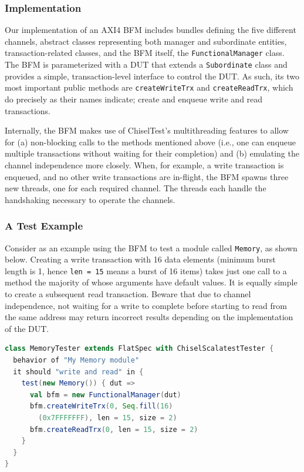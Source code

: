 \documentclass[conference]{IEEEtran}
\begin{document}
\subsubsection{Implementation}
Our implementation of an AXI4 BFM includes bundles defining the five different channels, abstract classes representing both manager and subordinate entities, transaction-related classes, and the BFM itself, the \texttt{FunctionalManager} class. The BFM is parameterized with a DUT that extends a \texttt{Subordinate} class and provides a simple, transaction-level interface to control the DUT. As such, its two most important public methods are \texttt{createWriteTrx} and \texttt{createReadTrx}, which do precisely as their names indicate; create and enqueue write and read transactions.

Internally, the BFM makes use of ChiselTest's multithreading features to allow for (a) non-blocking calls to the methods mentioned above (i.e., one can enqueue multiple transactions without waiting for their completion) and (b) emulating the channel independence more closely. When, for example, a write transaction is enqueued, and no other write transactions are in-flight, the BFM spawns three new threads, one for each required channel. The threads each handle the handshaking necessary to operate the channels.

\subsubsection{A Test Example}
Consider as an example using the BFM to test a module called \texttt{Memory}, as shown below. Creating a write transaction with 16 data elements (minimum burst length is 1, hence \texttt{len = 15} means a burst of 16 items) takes just one call to a method the majority of whose arguments have default values. It is equally simple to create a subsequent read transaction. Beware that due to channel independence, not waiting for a write to complete before starting to read from the same address may return incorrect results depending on the implementation of the DUT.
\begin{lstlisting}[language=scala, caption={Using the AXI4 BFM with ChiselTest}, label={lst:axitest}]
class MemoryTester extends FlatSpec with ChiselScalatestTester {
  behavior of "My Memory module"
  it should "write and read" in {
    test(new Memory()) { dut =>
      val bfm = new FunctionalManager(dut)
      bfm.createWriteTrx(0, Seq.fill(16)
      	(0x7FFFFFFF), len = 15, size = 2)
      bfm.createReadTrx(0, len = 15, size = 2)
    }
  }
}
\end{lstlisting}
\end{document}
